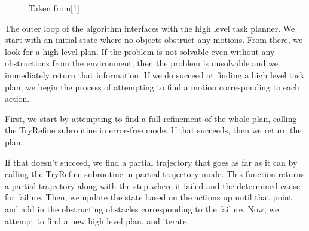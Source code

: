 \documentclass[12pt]{article}
\begin{document}
\begin{figure}[t]
	\centering
	\qquad
	\caption{Taken from[1]\label{fig:algorithms}}
\end{figure}

The outer loop of the algorithm interfaces with the high level task planner.  
We start with an initial state where no objects obstruct any motions.  
From there, we look for a high level plan.  
If the problem is not solvable even without any obstructions from the environment, then the problem is unsolvable and we immediately return that information.  
If we do succeed at finding a high level task plan, we begin the process of attempting to find a motion corresponding to each action.

First, we start by attempting to find a full refinement of the whole plan, calling the TryRefine subroutine in error-free mode.  
If that succeeds, then we return the plan.  

If that doesn't succeed, we find a partial trajectory that goes as far as it can by calling the TryRefine subroutine in partial trajectory mode.  
This function returns a partial trajectory along with the step where it failed and the determined cause for failure.  
Then, we update the state based on the actions up until that point and add in the obstructing obstacles corresponding to the failure.  
Now, we attempt to find a new high level plan, and iterate.  
\end{document}
